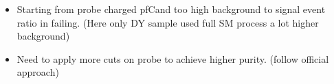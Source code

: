 \documentclass{beamer}
\begin{document}
\begin{frame}
\begin{columns}
\begin{column}{0.33\textwidth}
   \end{column}
  \end{columns}
\begin{itemize}
 \item Starting from probe charged pfCand too high background to signal event ratio in failing. (Here only DY sample used full SM process a lot higher background)
 \item Need to apply more cuts on probe to achieve higher purity. (follow official approach)
\end{itemize}
\end{frame}
\end{document}
